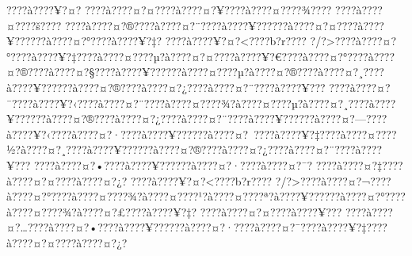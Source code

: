 \documentclass[11pt, openany]{book}
\begin{document}
{{{{{{{{{{{{{{{{{{{{{{{{{{{{{{{{{{{{{{{{{{{{{{{{{{{{{{{{{{{{{{{{{{{{{{{{{{{{{{{{{{{{{{{{{{{{{{{{{{{{{{{{{{{{{???\textbar{}?à???\textbar{}?¥?¤?
???\textbar{}?à???\textbar{}?¤?¤???\textbar{}?à???\textbar{}?¤?¥???\textbar{}?à???\textbar{}?¤???\textbar{}?¾???\textbar{}?
???\textbar{}?à???\textbar{}?¤???\textbar{}?š???\textbar{}?
???\textbar{}?à???\textbar{}?¤?®???\textbar{}?à???\textbar{}?¤?¨???\textbar{}?à???\textbar{}?¥?????\textbar{}?à???\textbar{}?¤?¤???\textbar{}?à???\textbar{}?¥?????\textbar{}?à???\textbar{}?¤?°???\textbar{}?à???\textbar{}?¥?‡?
???\textbar{}?à???\textbar{}?¥?¤?\textless{}???\textbar{}?b?r???\textbar{}?
?/?\textgreater{}???\textbar{}?à???\textbar{}?¤?°???\textbar{}?à???\textbar{}?¥?‡???\textbar{}?à???\textbar{}?¤???\textbar{}?µ?à???\textbar{}?¤?¤???\textbar{}?à???\textbar{}?¥?€???\textbar{}?à???\textbar{}?¤?°???\textbar{}?à???\textbar{}?¤?®???\textbar{}?à???\textbar{}?¤?§???\textbar{}?à???\textbar{}?¥?????\textbar{}?à???\textbar{}?¤???\textbar{}?µ?à???\textbar{}?¤?®???\textbar{}?à???\textbar{}?¤?¸???\textbar{}?à???\textbar{}?¥?????\textbar{}?à???\textbar{}?¤?®???\textbar{}?à???\textbar{}?¤?¿???\textbar{}?à???\textbar{}?¤?¨???\textbar{}?à???\textbar{}?¥???
???\textbar{}?à???\textbar{}?¤?¯???\textbar{}?à???\textbar{}?¥?‹???\textbar{}?à???\textbar{}?¤?¨???\textbar{}?à???\textbar{}?¤???\textbar{}?¾?à???\textbar{}?¤???\textbar{}?µ?à???\textbar{}?¤?¸???\textbar{}?à???\textbar{}?¥?????\textbar{}?à???\textbar{}?¤?®???\textbar{}?à???\textbar{}?¤?¿???\textbar{}?à???\textbar{}?¤?¨???\textbar{}?à???\textbar{}?¥?????\textbar{}?à???\textbar{}?¤?---???\textbar{}?à???\textbar{}?¥?‹???\textbar{}?à???\textbar{}?¤?·???\textbar{}?à???\textbar{}?¥?????\textbar{}?à???\textbar{}?¤?~???\textbar{}?à???\textbar{}?¥?‡???\textbar{}?à???\textbar{}?¤???\textbar{}?½?à???\textbar{}?¤?¸???\textbar{}?à???\textbar{}?¥?????\textbar{}?à???\textbar{}?¤?®???\textbar{}?à???\textbar{}?¤?¿???\textbar{}?à???\textbar{}?¤?¨???\textbar{}?à???\textbar{}?¥???
???\textbar{}?à???\textbar{}?¤?•???\textbar{}?à???\textbar{}?¥?????\textbar{}?à???\textbar{}?¤?·???\textbar{}?à???\textbar{}?¤?¯?
???\textbar{}?à???\textbar{}?¤?‡???\textbar{}?à???\textbar{}?¤?¤???\textbar{}?à???\textbar{}?¤?¿?
???\textbar{}?à???\textbar{}?¥?¤?\textless{}???\textbar{}?b?r???\textbar{}?
?/?\textgreater{}???\textbar{}?à???\textbar{}?¤?¬???\textbar{}?à???\textbar{}?¤?°???\textbar{}?à???\textbar{}?¤???\textbar{}?¾?à???\textbar{}?¤???\textbar{}?¹?à???\textbar{}?¤???\textbar{}?ª?à???\textbar{}?¥?????\textbar{}?à???\textbar{}?¤?°???\textbar{}?à???\textbar{}?¤???\textbar{}?¾?à???\textbar{}?¤?£???\textbar{}?à???\textbar{}?¥?‡?
???\textbar{}?à???\textbar{}?¤?¤???\textbar{}?à???\textbar{}?¥???
???\textbar{}?à???\textbar{}?¤?\ldots{}???\textbar{}?à???\textbar{}?¤?•???\textbar{}?à???\textbar{}?¥?????\textbar{}?à???\textbar{}?¤?·???\textbar{}?à???\textbar{}?¤?¯???\textbar{}?à???\textbar{}?¥?‡???\textbar{}?à???\textbar{}?¤?¤???\textbar{}?à???\textbar{}?¤?¿?
}}}}}}}}}}}}}}}}}}}}}}}}}}}}}}}}}}}}}}}}}}}}}}}}}}}}}}}}}}}}}}}}}}}}}}}}}}}}}}}}}}}}}}}}}}}}}}}}}}}}}}}}}}}}}
\end{document}

